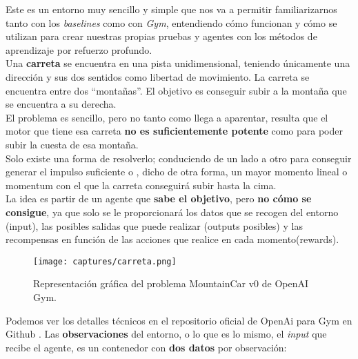 \documentclass[11pt,fleqn]{book} %
\begin{document}
Este es un entorno muy sencillo y simple que nos va a permitir familiarizarnos tanto con los \textit{baselines} como con \textit{Gym}, entendiendo cómo funcionan y cómo se utilizan para crear nuestras propias pruebas y agentes con los métodos de aprendizaje por refuerzo profundo. \\

Una \textbf{carreta} se encuentra en una pista unidimensional, teniendo únicamente una dirección y sus dos sentidos como libertad de movimiento. La carreta se encuentra entre dos ``montañas''. El objetivo es conseguir subir a la montaña que se encuentra a su derecha. \\

El problema es sencillo, pero no tanto como llega a aparentar, resulta que el motor que tiene esa carreta \textbf{no es suficientemente potente} como para poder subir la cuesta de esa montaña. \\

Solo existe una forma de resolverlo; conduciendo de un lado a otro para conseguir generar el impulso suficiente o , dicho de otra forma, un mayor momento lineal o momentum con el que la carreta conseguirá subir hasta la cima. \\

La idea es partir de un agente que \textbf{sabe el objetivo}, pero \textbf{no cómo se consigue}, ya que solo se le proporcionará los datos que se recogen del entorno (input), las posibles salidas que puede realizar (outputs posibles) y las recompensas en función de las acciones que realice en cada momento(rewards). \\

\begin{figure}[H]
	\centering\texttt{[image: captures/carreta.png]}
	\caption{Representación gráfica del problema MountainCar v0 de OpenAI Gym.}
	\label{fig:carreta} %
\end{figure}

Podemos ver los detalles técnicos en el repositorio oficial de OpenAi para Gym en Github \cite{article:mountain2}. Las \textbf{observaciones} del entorno, o lo que es lo mismo, el \textit{input} que recibe el agente, es un contenedor con \textbf{dos datos} por observación: \\
\end{document}
